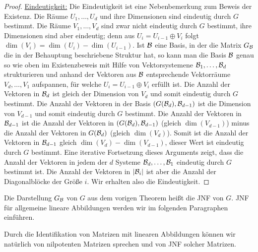 \begin{proof}
\underline{Eindeutigkeit:} Die Eindeutigkeit ist eine Nebenbemerkung zum Beweis der Existenz. Die Räume $U_1,\ldots,U_d$ und ihre Dimensionen sind eindeutig durch $G$ bestimmt. Die Räume $V_1,\ldots,V_d$ sind zwar nicht eindeutig durch $G$ bestimmt, ihre Dimensionen sind aber eindeutig; denn aus $U_i = U_{i-1} \oplus V_i$ folgt $\dim(V_i) = \dim(U_i) - \dim(U_{i-1})$. Ist $\mathcal{B}$ eine Basis, in der die Matrix $G_{\mathcal{B}}$ die in der Behauptung beschriebene Struktur hat, so kann man die Basis $\mathcal{B}$ genau so wie oben im Existenzbeweis mit Hilfe von Vektorsystemene $\mathcal{B}_1,\ldots,\mathcal{B}_d$ strukturieren und  anhand der Vektoren aus $\mathcal{B}$ entsprechende Vektorräume $V_d,\ldots,V_1$ aufspannen, für welche $U_i = U_{i-1} \oplus V_i$ erfüllt ist. Die Anzahl der Vektoren in $\mathcal{B}_d$ ist gleich der Dimension von $V_d$ und somit eindeutig durch $G$ bestimmt. Die Anzahl der Vektoren in der Basis $(G(\mathcal{B}_d),\mathcal{B}_{d-1})$ ist die Dimension von $V_{d-1}$ und somit eindeutig durch $G$ bestimmt. Die Anzahl der Vektoren in $\mathcal{B}_{d-1}$ ist die Anzahl der Vektoren in $(G(\mathcal{B}_d),\mathcal{B}_{d-1})$ (gleich $\dim(V_{d-1})$) minus die Anzahl der Vektoren in $G(\mathcal{B}_d)$ (gleich $\dim(V_d)$). Somit ist die Anzahl der Vektoren in $\mathcal{B}_{d-1}$ gleich $\dim(V_d)-\dim(V_{d-1})$, dieser Wert ist eindeutig durch $G$ bestimmt. Eine iterative Fortsetzung dieses Arguments zeigt, dass die Anzahl der Vektoren in jedem der $d$ Systeme $\mathcal{B}_d,\ldots,\mathcal{B}_1$ eindeutig durch $G$ bestimmt ist. Die Anzahl der Vektoren in $|\mathcal{B}_i|$ ist aber die Anzahl der Diagonalblöcke der Größe $i$. Wir erhalten also die Eindeutigkeit. 
\end{proof}

Die Darstellung $G_{\mathcal{B}}$ von $G$ aus dem vorigen Theorem heißt die JNF von $G$. JNF für allgemeine lineare Abbildungen werden wir im folgenden Paragraphen einführen.

Durch die Identifikation von Matrizen mit linearen Abbildungen können wir natürlich von nilpotenten Matrizen sprechen und von JNF solcher Matrizen. 

